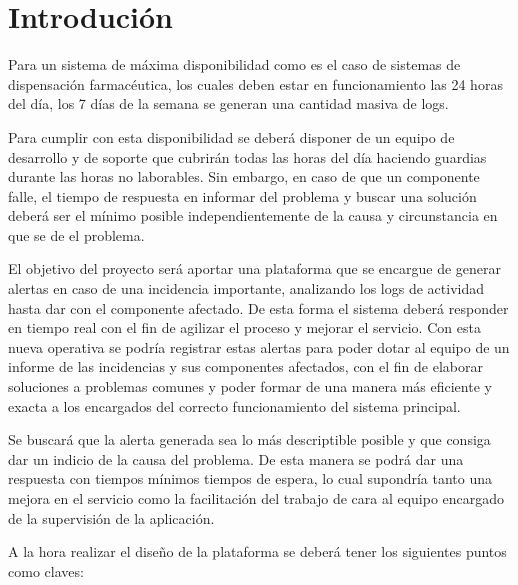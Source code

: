 \chapter{Introdución}

Para un sistema de máxima disponibilidad como es el caso de sistemas de dispensación farmacéutica,
los cuales deben estar en funcionamiento las 24 horas del día, los 7 días de la semana se generan una cantidad masiva de logs.

Para cumplir con esta disponibilidad se deberá disponer de un equipo de desarrollo y de soporte que cubrirán todas las horas del día haciendo guardias durante las horas no laborables. Sin embargo, en caso de que un componente falle, el tiempo de respuesta en informar del problema y buscar una solución deberá ser el mínimo posible independientemente de la causa y circunstancia en que se de el problema.

El objetivo del proyecto será aportar una plataforma que se encargue de generar alertas en caso de
una incidencia importante, analizando los logs de actividad hasta dar con el componente afectado. De esta forma el sistema deberá responder en tiempo real con el fin de agilizar el proceso y mejorar el servicio. Con esta nueva operativa se podría registrar estas alertas para poder dotar al equipo de un informe de las incidencias y sus componentes afectados, con el fin de elaborar soluciones a problemas comunes y poder formar de una manera más eficiente y exacta a los encargados del correcto funcionamiento del sistema principal.

Se buscará que la alerta generada sea lo más descriptible posible y que consiga dar un indicio de la causa
del problema. De esta manera se podrá dar una respuesta con tiempos mínimos tiempos de espera, lo
cual supondría tanto una mejora en el servicio como la facilitación del trabajo de cara al equipo
encargado de la supervisión de la aplicación.

A la hora realizar el diseño de la plataforma se deberá tener los siguientes puntos como claves: 

